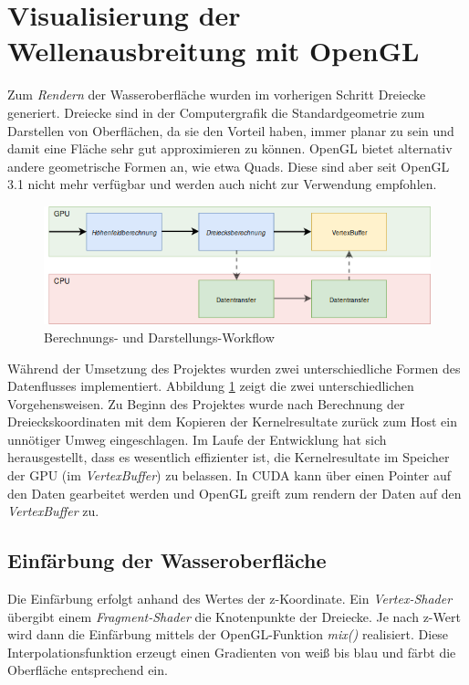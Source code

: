 \documentclass[conference]{IEEEtran}
\begin{document}
\section{Visualisierung der Wellenausbreitung mit OpenGL}
Zum \textit{Rendern} der Wasseroberfl\"ache wurden im vorherigen Schritt Dreiecke generiert. Dreiecke sind in der Computergrafik die Standardgeometrie zum Darstellen von Oberfl\"achen, da sie den Vorteil haben, immer planar zu sein und damit eine Fl\"ache sehr gut approximieren zu k\"onnen. OpenGL bietet alternativ andere geometrische Formen an, wie etwa Quads. Diese sind aber seit OpenGL 3.1 nicht mehr verf\"ugbar und werden auch nicht zur Verwendung empfohlen.\cite{onlPrimitives}

\begin{figure}[H]
\centerline{\includegraphics[scale=0.40]{img/pipeline.png}}
\label{fig:workflow}
\caption{Berechnungs- und Darstellungs-Workflow}
\end{figure}
W\"ahrend der Umsetzung des Projektes wurden zwei unterschiedliche Formen des Datenflusses implementiert. Abbildung \ref{fig:workflow} zeigt die zwei unterschiedlichen Vorgehensweisen. Zu Beginn des Projektes wurde nach Berechnung der Dreieckskoordinaten mit dem Kopieren der Kernelresultate zur\"uck zum Host ein unn\"otiger Umweg eingeschlagen. Im Laufe der Entwicklung hat sich herausgestellt, dass es wesentlich effizienter ist, die Kernelresultate im Speicher der GPU (im \textit{VertexBuffer}) zu belassen. In CUDA kann \"uber einen Pointer auf den Daten gearbeitet werden und OpenGL greift zum rendern der Daten auf den \textit{VertexBuffer} zu.

\subsection{Einf\"arbung der Wasseroberfl\"ache}
Die Einf\"arbung erfolgt anhand des Wertes der z-Koordinate. Ein 
\textit{Vertex-Shader} \"ubergibt einem \textit{Fragment-Shader} die Knotenpunkte der Dreiecke. Je nach z-Wert wird dann die Einf\"arbung mittels der OpenGL-Funktion \textit{mix()} realisiert. Diese Interpolationsfunktion erzeugt einen Gradienten von wei{\ss} bis blau und f\"arbt die Oberfl\"ache entsprechend ein.
\end{document}
